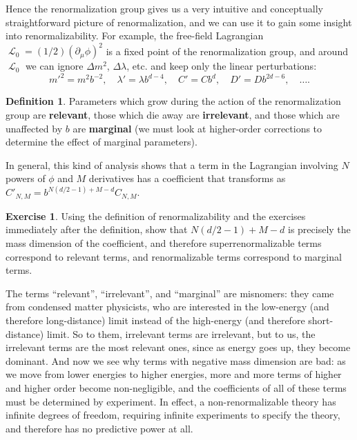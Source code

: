 \documentclass{report}
\theoremstyle{plain}
\theoremstyle{definition}
\newtheorem{definition}[theorem]{Definition}
\newtheorem{exercise}{Exercise}[section]
\theoremstyle{remark}
\DeclareMathOperator{\cL}{\mathcal{L}}
\begin{document}
Hence the renormalization group gives us a very intuitive and
conceptually straightforward picture of renormalization, and we can
use it to gain some insight into renormalizability. For example, the
free-field Lagrangian $\cL_0 = (1/2)(\partial_\mu\phi)^2$ is a fixed
point of the renormalization group, and around $\cL_0$ we can ignore
$\Delta m^2$, $\Delta \lambda$, etc. and keep only the linear
perturbations:
$$ m'^2 = m^2 b^{-2}, \quad \lambda' = \lambda b^{d-4}, \quad C' = C b^d, \quad D' = D b^{2d-6}, \quad \ldots. $$

\begin{definition}
  Parameters which grow during the action of the renormalization group
  are {\bf relevant}, those which die away are {\bf irrelevant}, and
  those which are unaffected by $b$ are {\bf marginal} (we must look
  at higher-order corrections to determine the effect of marginal
  parameters).
\end{definition}

In general, this kind of analysis shows that a term in the Lagrangian
involving $N$ powers of $\phi$ and $M$ derivatives has a coefficient
that transforms as $C'_{N,M} = b^{N(d/2-1) + M - d}C_{N,M}$.

\begin{exercise}
  Using the definition of renormalizability and the exercises
  immediately after the definition, show that $N(d/2-1) + M - d$ is
  precisely the mass dimension of the coefficient, and therefore
  superrenormalizable terms correspond to relevant terms, and
  renormalizable terms correspond to marginal terms.
\end{exercise}

The terms ``relevant'', ``irrelevant'', and ``marginal'' are
misnomers: they came from condensed matter physicists, who are
interested in the low-energy (and therefore long-distance) limit
instead of the high-energy (and therefore short-distance) limit. So to
them, irrelevant terms are irrelevant, but to us, the irrelevant terms
are the most relevant ones, since as energy goes up, they become
dominant. And now we see why terms with negative mass dimension are
bad: as we move from lower energies to higher energies, more and more
terms of higher and higher order become non-negligible, and the
coefficients of all of these terms must be determined by experiment.
In effect, a non-renormalizable theory has infinite degrees of
freedom, requiring infinite experiments to specify the theory, and
therefore has no predictive power at all.
\end{document}
